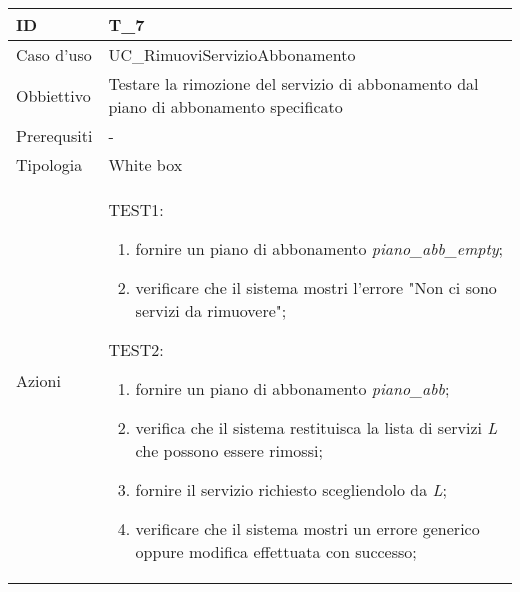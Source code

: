\begin{table}[hb]
    \centering
    \begin{tabular}{ |p{2cm}|p{10cm}|  }
        \hline
        ID & T\_7 \\\hline
        Caso d'uso & UC\_RimuoviServizioAbbonamento \\\hline   
        Obbiettivo & Testare la rimozione del servizio di abbonamento dal piano di abbonamento specificato \\\hline
        Prerequsiti & - \\\hline
        Tipologia & White box \\\hline
        Azioni & 
        TEST1:
        \begin{enumerate}[topsep=0pt]
            \item fornire un piano di abbonamento \emph{piano\_abb\_empty};
            \item verificare che il sistema mostri l'errore "Non ci sono servizi da rimuovere";
        \end{enumerate}
        \vspace{0.5cm} TEST2:
        \begin{enumerate}[topsep=0pt]
            \item fornire un piano di abbonamento \emph{piano\_abb};
            \item verifica che il sistema restituisca la lista di servizi \emph{L} che possono essere rimossi;
            \item fornire il servizio richiesto scegliendolo da \emph{L};
            \item verificare che il sistema mostri un errore generico oppure modifica effettuata con successo;
        \end{enumerate}
        \\\hline
    \end{tabular}
\end{table}

